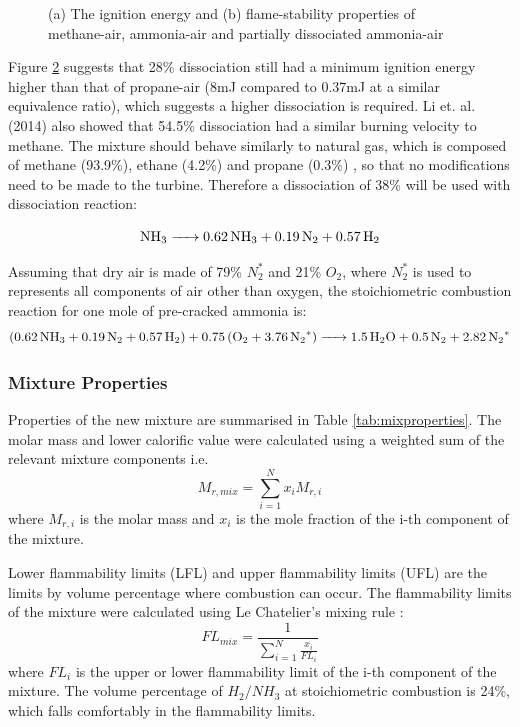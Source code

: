 \begin{figure} [h]
\begin{subfigure}{.5\textwidth}
  \label{fig:sub2}
\end{subfigure}
\caption{(a) The ignition energy and (b) flame-stability properties of methane-air, ammonia-air and partially dissociated ammonia-air \cite{verkamp}}
\label{fig:mixproperties2}
\end{figure} 

Figure \ref{fig:mixproperties2} suggests that 28\% dissociation still had a minimum ignition energy higher than that of propane-air (8mJ compared to 0.37mJ at a similar equivalence ratio), which suggests a higher dissociation is required. Li et. al. (2014) \cite{junLi} also showed that 54.5\% dissociation had a similar burning velocity to methane. The mixture should behave similarly to natural gas, which is composed of methane (93.9\%), ethane (4.2\%) and propane (0.3\%) \cite{website:uniongas}, so that no modifications need to be made to the turbine. Therefore a dissociation of 38\% will be used with dissociation reaction:

\begin{equation}
\ce{NH_3 -> 0.62 NH_3 + 0.19 N_2 + 0.57 H_2}
\end{equation}

Assuming that dry air is made of 79\% $N_2^*$ and 21\% $O_2$, where $N_2^*$ is used to represents all components of air other than oxygen, the stoichiometric combustion reaction for one mole of pre-cracked ammonia is:
\begin{equation}
\ce{(0.62 NH_3 + 0.19 N_2 + 0.57 H_2) + 0.75(O_2 + 3.76 N_2^*) ->1.5H_2O + 0.5N_2 + 2.82N_2^*}
\end{equation}

\subsubsection {Mixture Properties}
Properties of the new mixture are summarised in Table \ref{tab:mixproperties}. The molar mass and lower calorific value were calculated using a weighted sum of the relevant mixture components i.e.
\begin{equation}
M_{r, mix} = \sum_{i=1}^{N} x_i M_{r,i}
\end{equation}
where $M_{r, i}$ is the molar mass and $x_i$ is the mole fraction of the i-th component of the mixture. 

Lower flammability limits (LFL) and upper flammability limits (UFL) are the limits by volume percentage where combustion can occur. The flammability limits of the mixture were calculated using Le Chatelier's mixing rule \cite{chat}: 
\begin{equation}
FL_{mix} = \frac{1}{\sum_{i=1}^{N} \frac{x_i}{FL_i}}
\end{equation}
where $FL_{i}$ is the upper or lower flammability limit of the i-th component of the mixture. The volume percentage of $H_2/NH_3$ at stoichiometric combustion is 24\%, which falls comfortably in the flammability limits.

